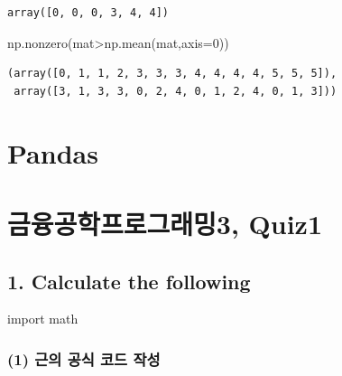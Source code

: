 \documentclass[
  letterpaper,
  DIV=11,
  numbers=noendperiod]{scrreprt}
\newenvironment{Shaded}{\begin{snugshade}}{\end{snugshade}}
\newcommand{\DecValTok}[1]{\textcolor[rgb]{0.68,0.00,0.00}{#1}}
\newcommand{\ImportTok}[1]{\textcolor[rgb]{0.00,0.46,0.62}{#1}}
\newcommand{\NormalTok}[1]{\textcolor[rgb]{0.00,0.23,0.31}{#1}}
\newcommand{\OperatorTok}[1]{\textcolor[rgb]{0.37,0.37,0.37}{#1}}
\begin{document}
\begin{verbatim}
array([0, 0, 0, 3, 4, 4])
\end{verbatim}

\begin{Shaded}
\begin{Highlighting}[]
\NormalTok{np.nonzero(mat}\OperatorTok{\textgreater{}}\NormalTok{np.mean(mat,axis}\OperatorTok{=}\DecValTok{0}\NormalTok{))}
\end{Highlighting}
\end{Shaded}

\begin{verbatim}
(array([0, 1, 1, 2, 3, 3, 3, 4, 4, 4, 4, 5, 5, 5]),
 array([3, 1, 3, 3, 0, 2, 4, 0, 1, 2, 4, 0, 1, 3]))
\end{verbatim}

\chapter{Pandas}\label{pandas}

\chapter*{금융공학프로그래밍3,
Quiz1}\label{uxae08uxc735uxacf5uxd559uxd504uxb85cuxadf8uxb798uxbc0d3-quiz1}


\section*{1. Calculate the following}\label{calculate-the-following}


\begin{Shaded}
\begin{Highlighting}[]
\ImportTok{import}\NormalTok{ math}
\end{Highlighting}
\end{Shaded}

\subsection*{(1) 근의 공식 코드
작성}\label{uxadfcuxc758-uxacf5uxc2dd-uxcf54uxb4dc-uxc791uxc131}
\end{document}
